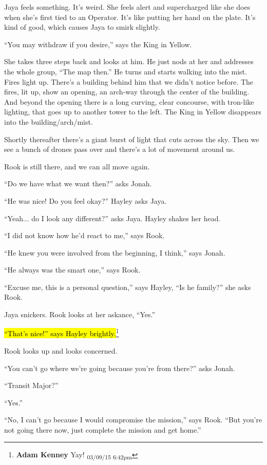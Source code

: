 Jaya feels something.  It's weird. She feels alert and supercharged like she does when she's first tied to an Operator.  It's like putting her hand on the plate.  It's kind of good, which causes Jaya to smirk slightly.



``You may withdraw if you desire,'' says the King in Yellow.

She takes three steps back and looks at him.  He just nods at her and addresses the whole group, ``The map then.''  He turns and starts walking into the mist.  Fires light up.  There's a building behind him that we didn't notice before. The fires, lit up, show an opening, an arch-way through the center of the building.  And beyond the opening there is a long curving, clear concourse, with tron-like lighting, that goes up to another tower to the left.  The King in Yellow disappears into the building/arch/mist.



Shortly thereafter there's a giant burst of light that cuts across the sky.  Then we see a bunch of drones pass over and there's a lot of movement around us. 

Rook is still there, and we can all move again.

``Do we have what we want then?'' asks Jonah.

``He was nice!   Do you feel okay?'' Hayley asks Jaya.

``Yeah... do I look any different?'' asks Jaya.   Hayley shakes her head.

``I did not know how he'd react to me,'' says Rook.

``He knew you were involved from the beginning, I think,'' says Jonah.

``He always was the smart one,'' says Rook.

``Excuse me, this is a personal question,'' says Hayley, ``Is he family?'' she asks Rook.

Jaya snickers.  Rook looks at her askance, ``Yes.''

\hl{``That's nice!'' says Hayley brightly.}\footnote{\textbf{Adam Kenney }Yay! \textsubscript{03/09/15 6:42pm}}



Rook looks up and looks concerned.

``You can't go where we're going because you're from there?'' asks Jonah.

``Transit Major?''

``Yes.''

``No, I can't go because I would compromise the mission,'' says Rook.  ``But you're not going there now, just complete the mission and get home.''


